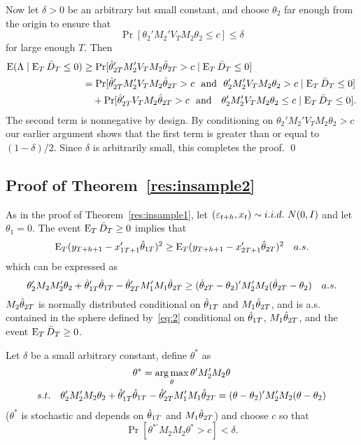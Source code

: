 \documentclass[12pt]{article}
\begin{document}
Now let $\delta > 0$ be an arbitrary but small constant, and choose
$\theta_2$ far enough from the origin to ensure that
\begin{equation*}
  \Pr[\theta_2'M_2' V_T M_2 \theta_2 \leq c] \leq \delta
\end{equation*}
for large enough $T$. Then
\begin{align*}
  \operatorname{E}(\Lambda \mid \operatorname{E}_T \bar{D}_{T} \leq 0) &
  \geq \Pr[\hat\theta_{2T}' M_2' V_T M_2 \hat\theta_{2T} > c \mid \operatorname{E}_T \bar{D}_{T} \leq 0] \\
  &= \Pr[\hat\theta_{2T}' M_2' V_T M_2 \hat\theta_{2T} > c \text{~~and~~}
  \theta_2'M_2' V_T M_2 \theta_2 > c \mid \operatorname{E}_T \bar{D}_{T}  \leq 0] \\
  & \quad + \Pr[\hat\theta_{2T}' V_T M_2 \hat\theta_{2T} > c \text{~~and~~ }
  \theta_2'M_2' V_T M_2 \theta_2 \leq c \mid \operatorname{E}_T \bar{D}_{T} \leq 0].
\end{align*}
The second term is nonnegative by design. By conditioning on
$\theta_2'M_2' V_T M_2 \theta_2 > c$ our earlier argument shows that
the first term is greater than or equal to $(1 - \delta) / 2$. Since
$\delta$ is arbitrarily small, this completes the proof.
\qed

\subsection*{Proof of Theorem~\ref{res:insample2}}
As in the proof of Theorem~\ref{res:insample1}, let $(\varepsilon_{t+h}, x_{t})
\sim i.i.d.\ N(0,I)$ and let $\theta_1 = 0$. The event $\operatorname{E}_T \bar{D}_{T}
\geq 0$ implies that
\begin{equation*}
  \operatorname{E}_T (y_{T+h+1} - x_{1T+1}'\hat\theta_{1T})^2
  \geq \operatorname{E}_T (y_{T+h+1} - x_{2T+1}'\hat\theta_{2T})^2 \quad a.s.
\end{equation*}
which can be expressed as
\begin{equation}\label{eq:2}
  \theta_2'M_2 M_2'\theta_2 + \hat\theta_{1T}'\hat\theta_{1T} - \hat\theta_{2T}'M_1'M_1\hat\theta_{2T}
  \geq (\hat\theta_{2T} - \theta_2)' M_2'M_2 (\hat\theta_{2T} - \theta_2) \quad a.s.
\end{equation}
$M_2 \hat\theta_{2T}$ is normally distributed conditional on $\hat\theta_{1T}$ and
$M_1 \hat\theta_{2T}$, and is a.s. contained in the sphere defined
by~\eqref{eq:2} conditional on $\hat\theta_{1T}$, $M_1 \hat\theta_{2T}$, and the
event $\operatorname{E}_T \bar{D}_{T} \geq 0$.

Let $\delta$ be a small arbitrary constant, define $\theta^*$ as
\begin{gather*}
  \theta^* = \operatorname*{arg\,max}_\theta \theta' M_2' M_2 \theta \\
  s.t.\quad \theta_2'M_2'M_2\theta_2 +  \hat\theta_{1T}'\hat\theta_{1T} - \hat\theta_{2T}'M_1'M_1\hat\theta_{2T} = (\theta - \theta_2)' M_2'M_2 (\theta - \theta_2)
\end{gather*}
($\theta^*$ is stochastic and depends on $\hat\theta_{1T}$ and $M_1 \hat\theta_{2T}$)
and choose $c$ so that
\begin{equation*}
  \Pr[ \theta^{* \prime} M_2 M_2 \theta^* > c] < \delta.
\end{equation*}
\end{document}
